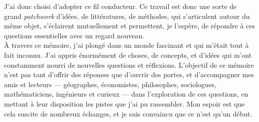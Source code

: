 J'ai donc choisi d'adopter ce fil conducteur. Ce travail est donc une sorte de grand \emph{patchwork} d'idées, de littératures, de méthodes, qui s'articulent autour du même objet, s'éclairent mutuellement et permettent, je l'espère, de répondre à ces questions essentielles avec un regard nouveau.  \\

À travers ce mémoire, j’ai plongé dans un monde fascinant et qui m'était tout à fait inconnu. J'ai appris énormément de choses, de concepts, et d’idées qui m'ont constamment nourri de nouvelles questions et réflexions. L’objectif de ce mémoire n’est pas tant d’offrir des réponses que d’ouvrir des portes, et d’accompagner mes amis et lecteurs — géographes, économistes, philosophes, sociologues, mathématiciens, ingénieurs et curieux — dans l'exploration de ces questions, en mettant à leur disposition les pistes que j’ai pu rassembler. Mon espoir est que cela suscite de nombreux échanges, et je suis convaincu que ce n’est qu’un début.